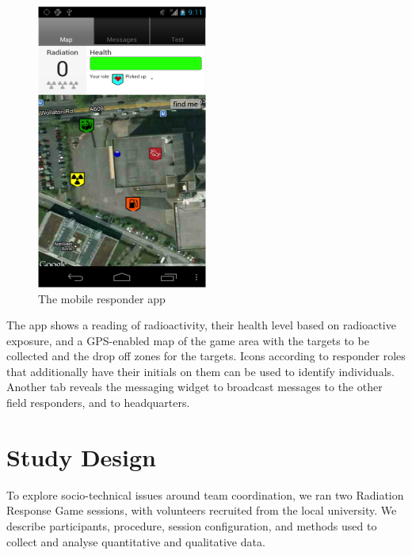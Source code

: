 \begin{figure}[h]
  \centering
  \includegraphics[width=0.5\textwidth]{img/study1/mobileinterface}
  \caption{The mobile responder app}
  \label{fig:mobileResponderApp}
\end{figure}

 The app shows a reading of radioactivity, their health level based on radioactive exposure, and a GPS-enabled map of the game area with the targets to be collected and the drop off zones for the targets. Icons according to responder roles that additionally have their initials on them can be used to identify individuals. Another tab reveals the messaging widget to broadcast messages to the other field responders, and to headquarters.\\



\section{Study Design}


To explore socio-technical issues around team coordination, we ran two Radiation Response Game sessions, with volunteers recruited from the local university. We describe participants, procedure, session configuration, and methods used to collect and analyse quantitative and qualitative data.\\

